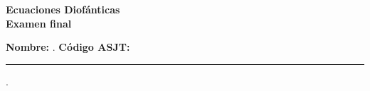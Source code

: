 \begin{center} \textbf
{
    \Large Ecuaciones Diofánticas \\ \vspace{2mm}Examen final
}
\end{center}

\vspace{8mm}

\textbf{Nombre:} \hrulefill.
\textbf{Código ASJT:} \rule{3cm}{0.1mm}.

\thispagestyle{first-page-style}